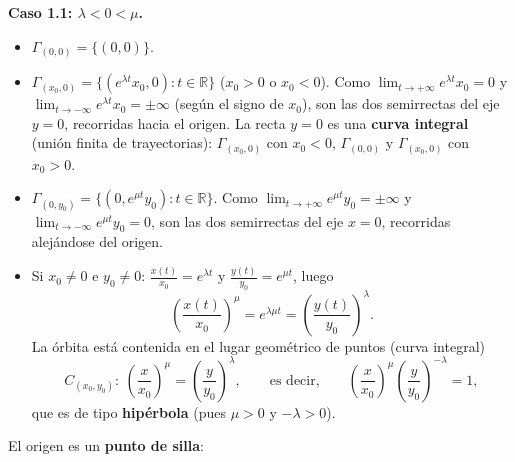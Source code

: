 \textbf{Caso 1.1: $\lambda < 0 < \mu$.}
\begin{itemize}
    \item $\Gamma_{(0,0)} = \{ (0,0) \}$.
    \item $\Gamma_{(x_0, 0)} = \{ (e^{\lambda t} x_0, 0) : t \in \mathbb{R} \}$ ($x_0 > 0$ o $x_0 < 0$). Como $\lim_{t \to +\infty} e^{\lambda t} x_0 = 0$ y $\lim_{t \to -\infty} e^{\lambda t} x_0 = \pm \infty$ (según el signo de $x_0$), son las dos semirrectas del eje $y = 0$, recorridas hacia el origen. La recta $y = 0$ es una \textbf{curva integral} (unión finita de trayectorias): $\Gamma_{(x_0,0)}$ con $x_0 < 0$, $\Gamma_{(0,0)}$ y $\Gamma_{(x_0,0)}$ con $x_0 > 0$.
    \item $\Gamma_{(0, y_0)} = \{ (0, e^{\mu t} y_0) : t \in \mathbb{R} \}$. Como $\lim_{t \to +\infty} e^{\mu t} y_0 = \pm \infty$ y $\lim_{t \to -\infty} e^{\mu t} y_0 = 0$, son las dos semirrectas del eje $x = 0$, recorridas alejándose del origen.
    \item Si $x_0 \neq 0$ e $y_0 \neq 0$: $\frac{x(t)}{x_0} = e^{\lambda t}$ y $\frac{y(t)}{y_0} = e^{\mu t}$, luego
    \[
        \left( \frac{x(t)}{x_0} \right)^\mu = e^{\lambda \mu t} = \left( \frac{y(t)}{y_0} \right)^\lambda.
    \]
    La órbita está contenida en el lugar geométrico de puntos (curva integral)
    \[
        C_{(x_0, y_0)} : \ \left( \frac{x}{x_0} \right)^\mu = \left( \frac{y}{y_0} \right)^\lambda, \qquad \text{es decir,} \qquad \left( \frac{x}{x_0} \right)^\mu \left( \frac{y}{y_0} \right)^{-\lambda} = 1,
    \]
    que es de tipo \textbf{hipérbola} (pues $\mu > 0$ y $-\lambda > 0$).
\end{itemize}
El origen es un \textbf{punto de silla}:
\begin{center}
\end{center}

